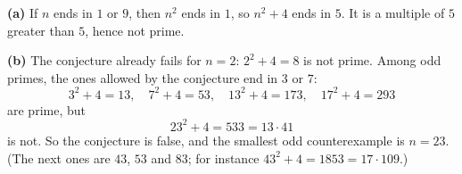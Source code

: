 \textbf{(a)} If $n$ ends in $1$ or $9$, then $n^2$ ends in $1$, so $n^2+4$ ends in $5$. It is a multiple of $5$ greater than $5$, hence not prime.

\textbf{(b)} The conjecture already fails for $n=2$: $2^2+4=8$ is not prime. Among odd primes, the ones allowed by the conjecture end in $3$ or $7$:
\[
3^2+4=13,\quad 7^2+4=53,\quad 13^2+4=173,\quad 17^2+4=293
\]
are prime, but
\[
23^2+4=533=13\cdot41
\]
is not. So the conjecture is false, and the smallest odd counterexample is $\boxed{n=23}$. (The next ones are $43$, $53$ and $83$; for instance $43^2+4=1853=17\cdot109$.)

